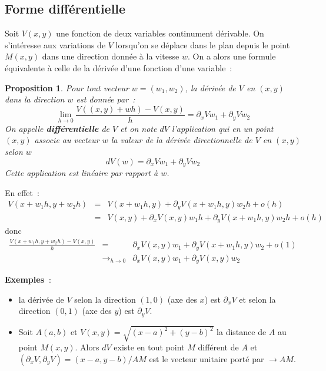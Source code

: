 \documentclass[a4paper,11pt]{article}
\newtheorem{prop}[thm]{Proposition}
\begin{document}
\begin{giacjshere}
\subsection{Forme diff\'erentielle}
Soit $V(x,y)$ une fonction de deux variables continument d\'erivable.
On s'int\'eresse aux variations de $V$ lorsqu'on se d\'eplace dans le
plan depuis le point $M(x,y)$ dans une direction donn\'ee \`a
la vitesse $w$.
On a alors une formule \'equivalente \`a celle de 
la d\'eriv\'ee d'une fonction d'une variable~:
\begin{prop}
Pour tout vecteur $w=(w_1,w_2)$, la d\'eriv\'ee de $V$ en $(x,y)$
dans la direction $w$ est donn\'ee par~:
$$ \lim_{h\rightarrow 0} \frac{V((x,y)+wh)-V(x,y)}{h}=
\partial_xVw_1+\partial_yV w_2$$
On appelle {\bf diff\'erentielle} 
de $V$ et on note $dV$ l'application
qui en un point $(x,y)$ associe au vecteur $w$ la valeur de la
d\'eriv\'ee directionnelle de $V$ en $(x,y)$ selon $w$
$$ dV(w)=\partial_xV w_1+\partial_yV w_2$$
Cette application est lin\'eaire par rapport \`a $w$.
\end{prop}
En effet~:
\begin{eqnarray*}
 V(x+w_1h,y+w_2h)&=&V(x+w_1h,y)+\partial_yV(x+w_1h,y) w_2h + o(h)\\
&=&V(x,y)+\partial_xV(x,y) w_1 h + \partial_yV(x+w_1h,y) w_2h + o(h)
\end{eqnarray*}
donc
\begin{eqnarray*}
 \frac{V(x+w_1h,y+w_2h)-V(x,y)}{h} & = &
\partial_xV(x,y) w_1 + \partial_yV(x+w_1h,y) w_2 +o(1) \\
&\rightarrow_{h\rightarrow 0} & \partial_xV(x,y) w_1
+ \partial_yV(x,y) w_2 
\end{eqnarray*}

{\bf Exemples~}: 
\begin{itemize}
\item la d\'eriv\'ee de $V$ selon la direction $(1,0)$ (axe des $x$)
est $\partial_xV$ et selon la direction $(0,1)$ (axe des $y$)
est $\partial_y V$.
\item Soit $A(a,b)$ et $V(x,y)=\sqrt{(x-a)^2+(y-b)^2}$ 
la distance de $A$ au point $M(x,y)$.
Alors $dV$ existe en tout point $M$ diff\'erent de $A$
et $(\partial_x V,\partial_y V)=(x-a,y-b)/AM$ est le vecteur
unitaire port\'e par $\rightarrow{AM}$.
\end{itemize}


\end{giacjshere}
\end{document}
